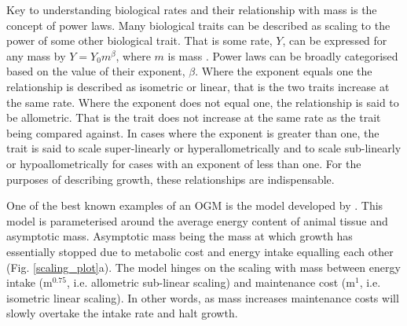 \documentclass[a4paper, 11pt, hidelinks]{article} %
\begin{document}
	Key to understanding biological rates and their relationship with mass is the concept of power laws. Many biological traits can be described as scaling to the power of some other biological trait.  That is some rate, $Y$, can be expressed for any mass by $Y = Y_0 m^\beta$, where $m$ is mass \parencite{Kleiber1932}.  Power laws can be broadly categorised based on the value of their exponent, $\beta$.  
	Where the exponent equals one the relationship is described as isometric or linear, that is the two traits increase at the same rate.  
	Where the exponent does not equal one, the relationship is said to be allometric.  That is the trait does not increase at the same rate as the trait being compared against.  In cases where the exponent is greater than one, the trait is said to scale super-linearly or hyperallometrically and to scale sub-linearly or hypoallometrically for cases with an exponent of less than one.
	For the purposes of describing growth, these relationships are indispensable.   
	
	
%	

	One of the best known examples of an OGM is the model developed by \cite{West2001}.  This model is parameterised around the average energy content of animal tissue and asymptotic mass.  Asymptotic mass being the mass at which growth has essentially stopped due to metabolic cost and energy intake equalling each other (Fig. \ref{scaling_plot}a). The model hinges on the scaling with mass between energy intake (m$^{0.75}$, i.e. allometric sub-linear scaling) and maintenance cost (m$^1$, i.e. isometric linear scaling).  In other words, as mass increases maintenance costs will slowly overtake the intake rate and halt growth.  	
	
\end{document}

